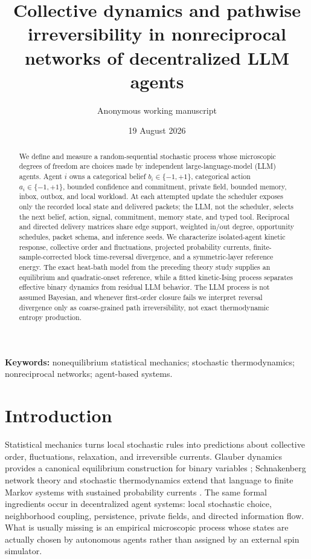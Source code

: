 \documentclass[12pt]{article}
\title{Collective dynamics and pathwise irreversibility in nonreciprocal networks of decentralized LLM agents}
\author{Anonymous working manuscript}
\date{19 August 2026}
\begin{document}
\maketitle

\begin{abstract}
We define and measure a random-sequential stochastic process whose microscopic
degrees of freedom are choices made by independent large-language-model (LLM)
agents. Agent $i$ owns a categorical belief $b_i\in\{-1,+1\}$, categorical
action $a_i\in\{-1,+1\}$, bounded confidence and commitment, private field,
bounded memory, inbox, outbox, and local workload. At each attempted update the
scheduler exposes only the recorded local state and delivered packets; the LLM,
not the scheduler, selects the next belief, action, signal, commitment, memory
state, and typed tool. Reciprocal and directed delivery matrices share edge
support, weighted in/out degree, opportunity schedules, packet schema, and
inference seeds. We characterize isolated-agent kinetic response, collective
order and fluctuations, projected probability currents, finite-sample-corrected
block time-reversal divergence, and a symmetric-layer reference energy. The
exact heat-bath model from the preceding theory study supplies an equilibrium
and quadratic-onset reference, while a fitted kinetic-Ising process separates
effective binary dynamics from residual LLM behavior. \AbstractResult{} The
LLM process is not assumed Bayesian, and whenever first-order closure fails we
interpret reversal divergence only as coarse-grained path irreversibility, not
exact thermodynamic entropy production.
\end{abstract}

\noindent\textbf{Keywords:} nonequilibrium statistical mechanics;
stochastic thermodynamics; nonreciprocal networks; agent-based systems.

\section{Introduction}

Statistical mechanics turns local stochastic rules into predictions about
collective order, fluctuations, relaxation, and irreversible currents. Glauber
dynamics provides a canonical equilibrium construction for binary variables
\cite{glauber1963}; Schnakenberg network theory and stochastic thermodynamics
extend that language to finite Markov systems with sustained probability
currents \cite{schnakenberg1976,lebowitz1999,seifert2005,seifert2012}. The same
formal ingredients occur in decentralized agent systems: local stochastic
choice, neighborhood coupling, persistence, private fields, and directed
information flow. What is usually missing is an empirical microscopic process
whose states are actually chosen by autonomous agents rather than assigned by
an external spin simulator.
\end{document}
